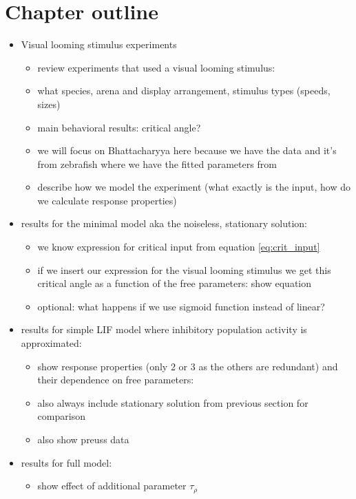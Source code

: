 \documentclass[a4paper,10pt,hidelinks]{scrreprt}
\begin{document}
	\section{Chapter outline}
	\begin{itemize}
		\item Visual looming stimulus experiments
		\begin{itemize}
			\item review experiments that used a visual looming stimulus:
			\item what species, arena and display arrangement, stimulus types (speeds, sizes)
			\item main behavioral results: critical angle?
			\item we will focus on Bhattacharyya here because we have the data and it's from 
			zebrafish where we have the fitted parameters from \cite{Koyama2016}
			\item describe how we model the experiment (what exactly is the input, how do we 
			calculate response properties)
		\end{itemize}
		\item results for the minimal model aka the noiseless, stationary solution:
		\begin{itemize}
			\item we know expression for critical input from equation \ref{eq:crit_input}
			\item if we insert our expression for the visual looming stimulus we get this critical 
			angle as a function of the free parameters: show equation
			\item optional: what happens if we use sigmoid function instead of linear?
		\end{itemize}
		\item results for simple LIF model where inhibitory population activity is approximated:
		\begin{itemize}
			\item show response properties (only 2 or 3 as the others are redundant) and their 
			dependence on free parameters: 
			\item also always include stationary solution from previous section for comparison
			\item also show preuss data
		\end{itemize}
		\item results for full model:
		\begin{itemize}
			\item show effect of additional parameter $\tau_{\rho}$

\end{itemize}
\end{itemize}
\end{document}
